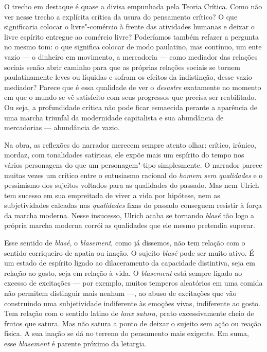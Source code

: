 O trecho em destaque é quase a divisa empunhada pela Teoria Crítica.
Como não ver nesse trecho a explícita crítica da usura do pensamento
crítico? O que significaria colocar o livre"-comércio à frente das
atividades humanas e deixar o livre espírito entregue ao comércio livre?
Poderíamos também refazer a pergunta no mesmo tom: o que significa
colocar de modo paulatino, mas contínuo, um ente vazio --- o dinheiro em
movimento, a mercadoria --- como mediador das relações sociais senão
abrir caminho para que as próprias relações sociais se tornem
paulatinamente leves ou líquidas e sofram os efeitos da indistinção,
desse vazio mediador? Parece que é essa qualidade de ver o
\emph{desastre} exatamente no momento em que o mundo se vê satisfeito
com seus progressos que precisa ser reabilitado. Ou seja, a profundidade
crítica não pode ficar esmaecida perante a aparência de uma marcha
triunfal da modernidade capitalista e sua abundância de mercadorias ---
abundância de vazio.

Na obra, as reflexões do narrador merecem sempre atento olhar: crítico,
irônico, mordaz, com tonalidades satíricas, ele expõe mais um espírito
do tempo nos vários personagens do que um personagem"-tipo simplesmente.
O narrador parece muitas vezes um crítico entre o entusiasmo racional do
\emph{homem sem qualidades} e o pessimismo dos sujeitos voltados para as
qualidades do passado. Mas nem Ulrich tem sucesso em sua empreitada de
viver a vida por hipótese, nem as subjetividades calcadas nas
\emph{qualidades} fixas do passado conseguem resistir à força da marcha
moderna. Nesse insucesso, Ulrich acaba se tornando \emph{blasé} tão logo
a própria marcha moderna corrói as qualidades que ele mesmo pretendia
superar.

Esse sentido de \emph{blasé}, o \emph{blasement}, como já dissemos, não
tem relação com o sentido corriqueiro de apatia ou inação. O sujeito
\emph{blasé} pode ser muito ativo. É um estado de espírito ligado ao
dilaceramento da capacidade distintiva, seja em relação ao gosto, seja
em relação à vida. O \emph{blasement} está sempre ligado ao excesso de
excitações --- por exemplo, muitos temperos aleatórios em uma comida não
permitem distinguir mais nenhum ---, ao abuso de excitações que vão
construindo uma subjetividade indiferente às emoções vivas, indiferente
ao gosto. Tem relação com o sentido latino de \emph{lanx satura}, prato
excessivamente cheio de frutos que satura. Mas não satura a ponto de
deixar o sujeito sem ação ou reação física. A sua inação se dá no
terreno do pensamento mais exigente. Em suma, esse \emph{blasement} é
parente próximo da letargia.

